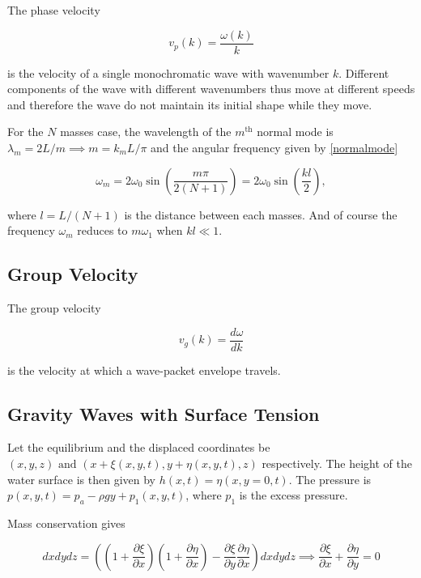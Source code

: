 \documentclass[a4paper,12pt]{report}
\begin{document}
The phase velocity 

\begin{equation}
	v_{p}(k) = \frac{\omega (k)}{k}  
\end{equation}

is the velocity of a single monochromatic wave with wavenumber \(k\). Different components of the wave with different wavenumbers thus move at different speeds and therefore the wave do not maintain its initial shape while they move.

For the \(N\) masses case, the wavelength of the \(m^{\text{th}} \) normal mode is \(\lambda _{m} = 2L /m \implies m = k_{m}L /\pi  \) and the angular frequency given by \cref{normalmode}

\begin{equation}
	\omega _{m} = 2 \omega _{0} \sin \left( \frac{m\pi }{2(N+1)}  \right) =  2 \omega _{0}\sin \left( \frac{kl}{2}  \right),
\end{equation}

where \(l = L /(N+1)\) is the distance between each masses. And of course the frequency \(\omega _{m} \) reduces to \(m \omega _{1} \) when \(kl \ll  1\).    

\subsection{Group Velocity}

The group velocity 

\begin{equation}
	v_{g}(k) = \frac{d \omega }{dk}  
\end{equation}

is the velocity at which a wave-packet envelope travels.


\subsection{Gravity Waves with Surface Tension}

Let the equilibrium and the displaced coordinates be \((x,y,z) \text { and } (x+\xi (x,y,t), y+\eta (x,y,t),z)\) respectively. The height of the water surface is then given by \(h(x,t) = \eta (x,y=0,t)\). The pressure is \(p(x,y,t) = p_{a} - \rho gy + p_1 (x,y,t)\), where \(p_1 \) is the excess pressure.

Mass conservation gives 

\begin{equation}
	dxdydz = \left( \left( 1+\frac{\partial \xi }{\partial x}  \right) \left( 1+\frac{\partial \eta }{\partial x}  \right) - \frac{\partial \xi }{\partial y} \frac{\partial \eta }{\partial x}   \right)dxdydz \implies \frac{\partial \xi }{\partial x} + \frac{\partial \eta }{\partial y}= 0  
\end{equation}
\end{document}
